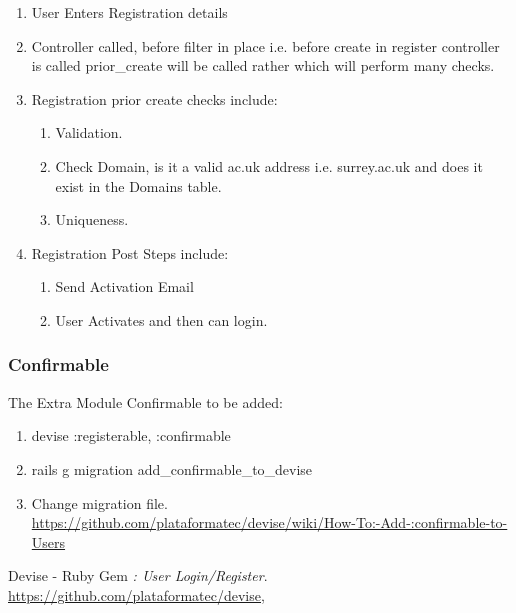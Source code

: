 \documentclass[11pt]{article}
\begin{document}
\begin{enumerate}
\item User Enters Registration details
\item Controller called, before filter in place i.e. before create in register controller is called prior\_create will be called rather which will perform many checks.
\item Registration prior create checks include:
	\begin{enumerate}
		\item Validation.
		\item Check Domain, is it a valid ac.uk address i.e. surrey.ac.uk and does it exist in the Domains table.
		\item Uniqueness.
	\end{enumerate}
\item Registration Post Steps include:
	\begin{enumerate}
		\item Send Activation Email
		\item User Activates and then can login.
	\end{enumerate}
\end{enumerate}

\subsubsection{Confirmable}
The Extra Module Confirmable to be added:
\begin{enumerate}
			\item devise :registerable, :confirmable
			\item rails g migration add_confirmable_to_devise
			\item Change migration file.
			\hfill \\
			{\url{https://github.com/plataformatec/devise/wiki/How-To:-Add-:confirmable-to-Users}}
		\end{enumerate}

\begin{thebibliography}{9}

  Devise - Ruby Gem
  \emph{: User Login/Register}.
  {\url{https://github.com/plataformatec/devise}},
\end{thebibliography}
\end{document}
